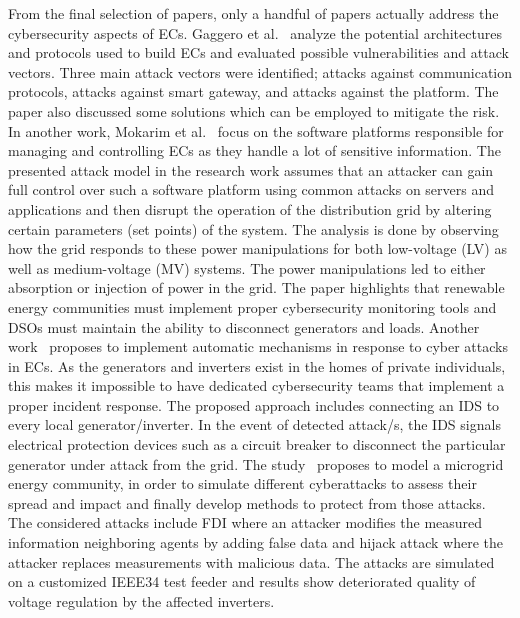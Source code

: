 From the final selection of papers, only a handful of papers actually address the cybersecurity aspects of ECs. Gaggero et al.~\cite{novel-EC} analyze the potential architectures and protocols used to build ECs and evaluated possible vulnerabilities and attack vectors. Three main attack vectors were identified; attacks against communication protocols, attacks against smart gateway, and attacks against the platform. The paper also discussed some solutions which can be employed to mitigate the risk. In another work, Mokarim et al.~\cite{impact-EC} focus on the software platforms responsible for managing and controlling ECs as they handle a lot of sensitive information. The presented attack model in the research work assumes that an attacker can gain full control over such a software platform using common attacks on servers and applications and then disrupt the operation of the distribution grid by altering certain parameters (set points) of the system. The analysis is done by observing how the grid responds to these power manipulations for both low-voltage (LV) as well as medium-voltage (MV) systems. The power manipulations led to either absorption or injection of power in the grid. The paper highlights that renewable energy communities must implement proper cybersecurity monitoring tools and DSOs must maintain the ability to disconnect generators and loads. Another work~\cite{should-we} proposes to implement automatic mechanisms in response to cyber attacks in ECs. As the generators and inverters exist in the homes of private individuals, this makes it impossible to have dedicated cybersecurity teams that implement a proper incident response. The proposed approach includes connecting an IDS to every local generator/inverter. In the event of detected attack/s, the IDS signals electrical protection devices such as a circuit breaker to disconnect the particular generator under attack from the grid. The study~\cite{micro-ec} proposes to model a microgrid energy community, in order to simulate different cyberattacks to assess their spread and impact and finally develop methods to protect from those attacks. The considered attacks include FDI where an attacker modifies the measured information neighboring agents by adding false data and hijack attack where the attacker replaces measurements with malicious data. The attacks are simulated on a customized IEEE34 test feeder and results show deteriorated quality of voltage regulation by the affected inverters. 


